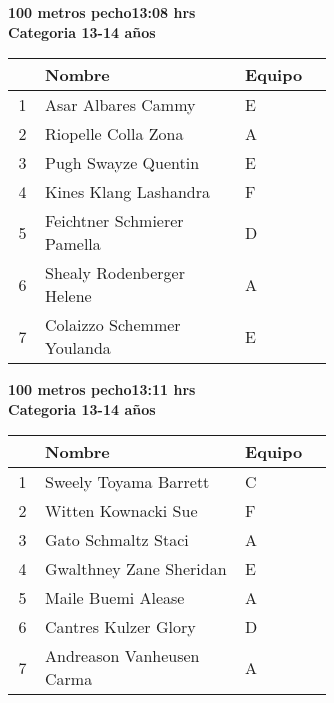 \begin{minipage}{0.95\linewidth}\vspace{0.5cm} 
\begin{flushleft}
\textbf{
\hspace{-0.15cm}100 metros pecho\hspace{1.5cm}13:08 hrs \\Categoria 13-14 años}\vspace{-0.2cm} 
\end{flushleft}
\begin{tabular}{cp{0.63\linewidth}l}
\hline
& \textbf{Nombre} & \textbf{Equipo} \\ \hline
1 & Asar Albares Cammy & E \\ 
2 & Riopelle Colla Zona & A \\ 
3 & Pugh Swayze Quentin & E \\ 
4 & Kines Klang Lashandra & F \\ 
5 & Feichtner Schmierer Pamella & D \\ 
6 & Shealy Rodenberger Helene & A \\ 
7 & Colaizzo Schemmer Youlanda & E \\ 
\end{tabular}
\end{minipage}
\begin{minipage}{0.95\linewidth}\vspace{0.5cm} 
\begin{flushleft}
\textbf{
\hspace{-0.15cm}100 metros pecho\hspace{1.5cm}13:11 hrs \\Categoria 13-14 años}\vspace{-0.2cm} 
\end{flushleft}
\begin{tabular}{cp{0.63\linewidth}l}
\hline
& \textbf{Nombre} & \textbf{Equipo} \\ \hline
1 & Sweely Toyama Barrett & C \\ 
2 & Witten Kownacki Sue & F \\ 
3 & Gato Schmaltz Staci & A \\ 
4 & Gwalthney Zane Sheridan & E \\ 
5 & Maile Buemi Alease & A \\ 
6 & Cantres Kulzer Glory & D \\ 
7 & Andreason Vanheusen Carma & A \\ 
\end{tabular}
\end{minipage}
